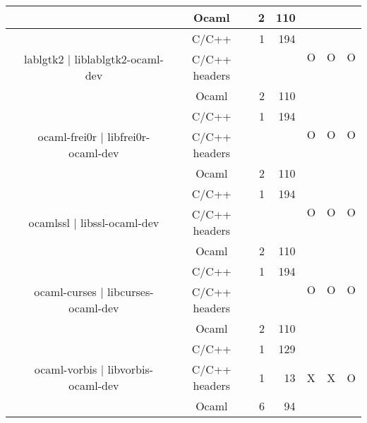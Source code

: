 \documentclass[11pt,a4paper]{article}
\begin{document}
\begin{table}[h,t]
\begin{tabular}{|>{\centering}m{3cm}| c|c|r|r| c| c|c|}
 \cline{3-5}   
 &                                  & Ocaml & 2 & 110  & & & \\       
 \cline{2-8}


 &\multirow{3}{3cm}{lablgtk2 | liblablgtk2-ocaml-dev} & C/C++ & 1 & 194  & \multirow{2}{*}{O} & \multirow{2}{*}{O} &

 \multirow{2}{*}{O}\\
 \cline{3-5}
 & &                           C/C++ headers &  &  & & & \\

 \cline{3-5}   
 &                                  & Ocaml & 2 & 110  & & & \\       
 \cline{2-8}

 &\multirow{3}{3cm}{ocaml-frei0r | libfrei0r-ocaml-dev} & C/C++ & 1 & 194  & \multirow{2}{*}{O} & \multirow{2}{*}{O} &

 \multirow{2}{*}{O}\\
 \cline{3-5}
 & &                           C/C++ headers &  &  & & & \\

 \cline{3-5}   
 &                                  & Ocaml & 2 & 110  & & & \\       
 \cline{2-8}



 &\multirow{3}{3cm}{ocamlssl | libssl-ocaml-dev} & C/C++ & 1 & 194  & \multirow{2}{*}{O} & \multirow{2}{*}{O} &

 \multirow{2}{*}{O}\\
 \cline{3-5}
 & &                           C/C++ headers &  &  & & & \\

 \cline{3-5}   
 &                                  & Ocaml & 2 & 110  & & & \\       
 \cline{2-8}


 &\multirow{3}{3cm}{ocaml-curses | libcurses-ocaml-dev} & C/C++ & 1 & 194  & \multirow{2}{*}{O} & \multirow{2}{*}{O} &

 \multirow{2}{*}{O}\\
 \cline{3-5}
 & &                           C/C++ headers &  &  & & & \\

 \cline{3-5}   
 &                                  & Ocaml & 2 & 110  & & & \\       
 \cline{2-8}


 &\multirow{3}{3cm}{ocaml-vorbis | libvorbis-ocaml-dev} & C/C++ & 1 & 129 & \multirow{3}{*}{X} & \multirow{3}{*}{X} & \multirow{3}{*}{O}\\
\cline{3-5}
& &                           C/C++ headers & 1 & 13 & & & \\
\cline{3-5}
& &                          Ocaml & 6 & 94 & & & \\
\hline

\end{tabular}
\end{table}
\end{document}
